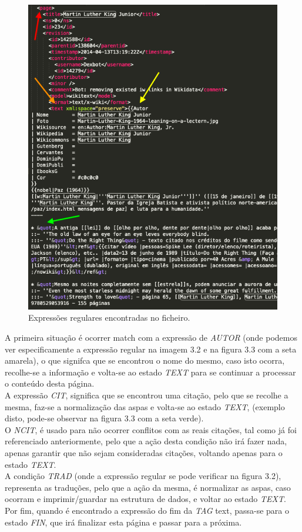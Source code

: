 \documentclass[11pt,a4paper]{report}%
\begin{document}
\begin{figure}[H]
	\centering
	\includegraphics[scale=0.6]{pagina.png}
	\caption{Expressões regulares encontradas no ficheiro.}
	\label{img:pag}
\end{figure}

A primeira situação é ocorrer match com a expressão de \emph{AUTOR} (onde podemos ver especificamente a expressão regular na imagem 3.2 e na figura 3.3 com a seta amarela), o que signifca que se encontrou o nome do mesmo, caso isto ocorra, recolhe-se a informação e volta-se ao estado \emph{TEXT} para se continuar a processar o conteúdo desta página. \\A expressão \emph{CIT}, significa que se encontrou uma citação, pelo que se recolhe a mesma, faz-se a normalização das aspas e volta-se ao estado \emph{TEXT}, (exemplo disto, pode-se observar na figura 3.3 com a seta verde). \\O \emph{NCIT}, é usado para não ocorrer conflitos com as reais citações, tal como já foi referenciado anteriormente, pelo que a ação desta condição não irá fazer nada, apenas garantir que não sejam consideradas citações, voltando apenas para o estado \emph{TEXT}. \\A condição \emph{TRAD} (onde a expressão regular se pode verificar na figura 3.2), representa as traduções, pelo que a ação da mesma, é normalizar as aspas, caso ocorram e imprimir/guardar na estrutura de dados, e voltar ao estado \emph{TEXT}.\\ Por fim, quando é encontrado a expressão do fim da \emph{TAG} text, passa-se para o estado \emph{FIN}, que irá finalizar esta página e passar para a próxima.
\end{document}
